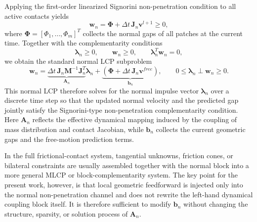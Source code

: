 Applying the first-order linearized Signorini non-penetration condition to all active contacts yields
\begin{equation}
    \mathbf{w}_n = \boldsymbol{\Phi} + \Delta t\,\mathbf{J}_n \mathbf{v}^{l+1} \ge 0,
\end{equation}
where $\boldsymbol{\Phi}=[\Phi_1,\ldots,\Phi_m]^T$ collects the normal gaps of all patches at the current time. Together with the complementarity conditions
\begin{equation}
    \boldsymbol{\lambda}_n \ge 0,\qquad
    \mathbf{w}_n \ge 0,\qquad
    \boldsymbol{\lambda}_n^T\mathbf{w}_n = 0,
\end{equation}
we obtain the standard normal LCP subproblem
\begin{equation}
    \mathbf{w}_n
    =
    \underbrace{\Delta t\,\mathbf{J}_n\mathbf{M}^{-1}\mathbf{J}_n^T}_{\mathbf{A}_n}
    \boldsymbol{\lambda}_n
    +
    \underbrace{\left(\boldsymbol{\Phi} + \Delta t\,\mathbf{J}_n \mathbf{v}^{free}\right)}_{\mathbf{b}_n},
    \qquad
    0 \le \boldsymbol{\lambda}_n \perp \mathbf{w}_n \ge 0.
\end{equation}
This normal LCP therefore solves for the normal impulse vector $\boldsymbol{\lambda}_n$ over a discrete time step so that the updated normal velocity and the predicted gap jointly satisfy the Signorini-type non-penetration complementarity condition. Here $\mathbf{A}_n$ reflects the effective dynamical mapping induced by the coupling of mass distribution and contact Jacobian, while $\mathbf{b}_n$ collects the current geometric gaps and the free-motion prediction terms.

In the full frictional-contact system, tangential unknowns, friction cones, or bilateral constraints are usually assembled together with the normal block into a more general MLCP or block-complementarity system. The key point for the present work, however, is that local geometric feedforward is injected only into the normal non-penetration channel and does not rewrite the left-hand dynamical coupling block itself. It is therefore sufficient to modify $\mathbf{b}_n$ without changing the structure, sparsity, or solution process of $\mathbf{A}_n$.


